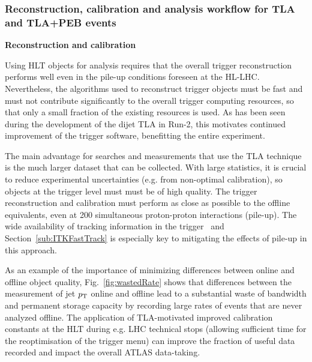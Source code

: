 \subsubsection{Reconstruction, calibration and analysis workflow for TLA and TLA+PEB events}

\textbf{Reconstruction and calibration} 


Using HLT objects for analysis requires that the overall trigger reconstruction performs well even in the pile-up conditions foreseen at the HL-LHC. 
Nevertheless, the algorithms used to reconstruct trigger objects must be fast and must not contribute significantly to the overall trigger computing resources, so that only a small fraction of the existing resources is used. 
As has been seen during the development of the dijet TLA in Run-2, this motivates continued improvement of the trigger software, benefitting the entire experiment.

The main advantage for searches and measurements that use the TLA technique is the much larger dataset that can be collected. 
With large statistics, it is crucial to reduce experimental uncertainties (e.g. from non-optimal calibration), so objects at the trigger level must must be of high quality. The trigger reconstruction and calibration must perform as close as possible to the offline equivalents, even at 200 simultaneous proton-proton interactions (pile-up).%
The wide availability of tracking information in the trigger~\cite{TDAQ baseline HTT} and Section~\ref{sub:ITKFastTrack} is especially key to mitigating the effects of pile-up in this approach.

As an example of the importance of minimizing differences between online and offline object quality, Fig.~\ref{fig:wastedRate} shows that differences between the measurement of jet $p_{\rm{T}}$ online and offline lead to a substantial waste of bandwidth and permanent storage capacity by recording large rates of events that are never analyzed offline.
The application of TLA-motivated improved calibration constants at the HLT during e.g. LHC technical stops (allowing sufficient time for the reoptimisation of the trigger menu) can improve the fraction of useful data recorded and impact the overall ATLAS data-taking. 

